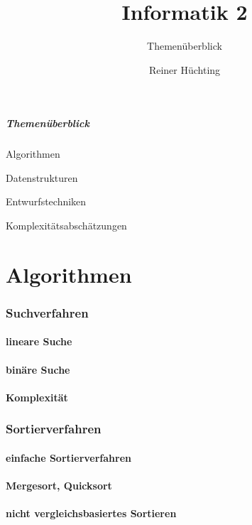 \documentclass{beamer}
\author{Reiner Hüchting}
\title{Informatik 2}
\subtitle{Themenüberblick}
\begin{document}
\maketitle

\begin{frame}
\frametitle{Themenüberblick}
\begin{block}{Algorithmen}\end{block}
\begin{block}{Datenstrukturen}\end{block}
\begin{block}{Entwurfstechniken}\end{block}
\begin{block}{Komplexitätsabschätzungen}\end{block}
\end{frame}

\part{Algorithmen}

\section{Suchverfahren}
\subsection{lineare Suche}
\subsection{binäre Suche}
\subsection{Komplexität}

\section{Sortierverfahren}
\subsection{einfache Sortierverfahren}
\subsection{Mergesort, Quicksort}
\subsection{nicht vergleichsbasiertes Sortieren}
\end{document}
